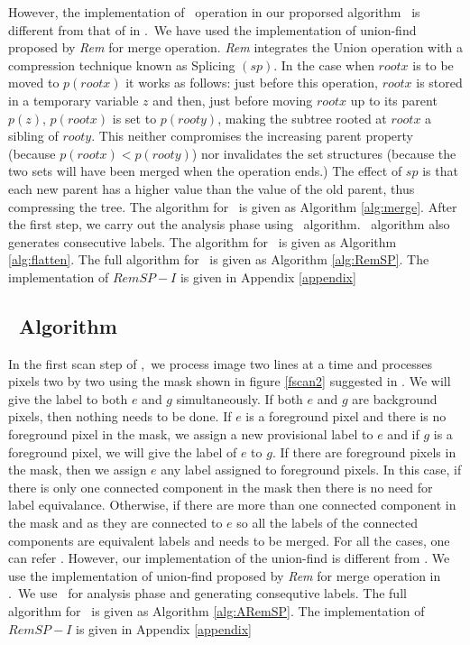 However, the implementation of \merge\ operation in our proporsed algorithm
\remsp\ is different from that of in \lrpc.\
We have used the implementation of union-find proposed by {\em Rem}
\cite{Patwary2010_RemSP} for merge operation. {\em Rem} integrates the Union
operation with a compression technique known as Splicing $(sp)$. In the case when 
$rootx$ is to be moved to $p(rootx)$ it works as follows: just before this operation, 
$rootx$ is stored in a temporary variable $z$ and 
then, just before moving $rootx$ up to its parent $p(z)$, $p(rootx)$ is set to $p(rooty)$, 
making the subtree rooted at 
$rootx$ a sibling of $rooty$. This neither compromises the increasing parent property (because $p(rootx) < p(rooty)$) 
nor invalidates the set structures (because the two sets will have been merged when the operation ends.) The effect of $sp$
is that each new parent has a higher value than the value of the old parent, thus compressing the tree. The algorithm for
\merge\ is given as Algorithm \ref{alg:merge}. After the first step, we carry
out the analysis phase using \flatten\ algorithm. \flatten\ algorithm also
generates consecutive labels. The algorithm for \flatten\ is given as Algorithm
\ref{alg:flatten}. The full algorithm for \remsp\ is given as Algorithm
\ref{alg:RemSP}. The implementation of $RemSP-I$ is given in Appendix
\ref{appendix}
% 


\subsection{\aremsp\ Algorithm}


In the first scan step of \aremsp,\ we process image two lines at a time and processes
pixels two by two using the mask shown in figure \ref{fscan2} suggested in \cite{He2012_ARun}. 
We will give the label to both $e$ and $g$ simultaneously. If both $e$ and $g$ are background pixels,
then nothing needs to be done. If $e$ is a foreground pixel and there is no foreground pixel in the mask, we assign a 
new provisional label to $e$ and if $g$ is a foreground pixel, we will give the
label of $e$ to $g$. If there are foreground pixels in the mask, then we assign $e$ any label assigned to 
foreground pixels. In this case, if there is only one connected component in the mask then there is 
no need for label equivalance. Otherwise, if there are more than one connected component in the mask and as 
they are connected to $e$ so all the labels of the connected components are
equivalent labels and needs to be merged. For all the cases, one can refer \cite{He2012_ARun}.
However, our implementation of the union-find is different from \cite{He2012_ARun}.
We use the implementation of union-find proposed by {\em Rem} \cite{Patwary2010_RemSP} for merge operation in
\aremsp.\ We use \flatten\ for analysis phase and generating consequtive
labels.
The full algorithm for \aremsp\ is given as Algorithm \ref{alg:ARemSP}. The
implementation of $RemSP-I$ is given in Appendix \ref{appendix}


% 





 
